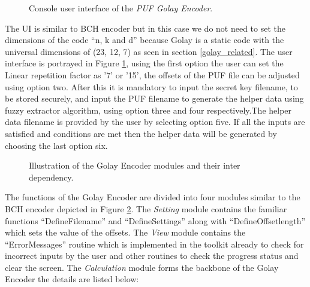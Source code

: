 	\begin{figure}
	\centering
	\caption{Console user interface of the \emph{PUF Golay Encoder}.}
	\label{img:golay_enc_ui}
	\end{figure}
	The UI is similar to BCH encoder but in this case we do not need to set the dimensions of the code ``n, k and d'' because Golay is a static code with the universal dimensions of (23, 12, 7) as seen in section \ref{golay_related}. The user interface is portrayed in Figure \ref{img:golay_enc_ui}, using the first option the user can set the Linear repetition factor as '7' or '15', the offsets of the PUF file can be adjusted using option two. After this it is mandatory to input the secret key filename, to be
	stored securely, and input the PUF filename to generate the helper data using fuzzy extractor algorithm, using option three and four respectively.The helper data filename is provided by the user by selecting option five. If all the inputs are satisfied and conditions are met then the helper data will be generated by choosing the last option six.\\


	\begin{figure}
	\centering
	\caption{Illustration of the Golay Encoder modules and their inter dependency.}
	\label{img:golay_enc_funcs}
	\end{figure}

	The functions of the Golay Encoder are divided into four modules similar to the BCH encoder depicted in Figure \ref{img:golay_enc_funcs}. The \emph{Setting} module contains the familiar functions ``DefineFilename'' and ``DefineSettings'' along with ``DefineOffsetlength'' which sets the value of the offsets. The \emph{View} module contains the ``ErrorMessages'' routine which is implemented in the toolkit already to check for incorrect inputs by the user and other routines to check the progress status and
	clear the screen. The \emph{Calculation} module forms the backbone of the Golay Encoder the details are listed below:

